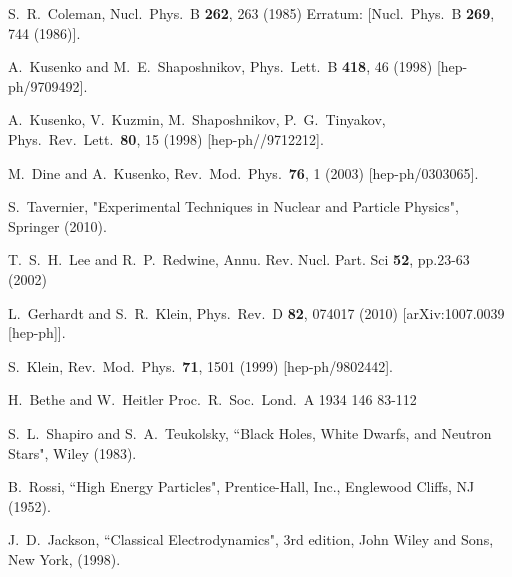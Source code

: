   S.~R.~Coleman,
  Nucl.\ Phys.\ B {\bf 262}, 263 (1985)
  Erratum: [Nucl.\ Phys.\ B {\bf 269}, 744 (1986)].


  A.~Kusenko and M.~E.~Shaposhnikov,
  Phys.\ Lett.\ B {\bf 418}, 46 (1998)
  [hep-ph/9709492].


  A.~Kusenko, V.~Kuzmin, M.~Shaposhnikov, P.~G.~Tinyakov,
  Phys.\ Rev.\ Lett.\ {\bf 80}, 15 (1998)
  [hep-ph//9712212].

  M.~Dine and A.~Kusenko,
  Rev.\ Mod.\ Phys.\  {\bf 76}, 1 (2003)
  [hep-ph/0303065].


S.~Tavernier, "Experimental Techniques in Nuclear and Particle Physics", Springer (2010).

T.~S.~H.~Lee and R.~P.~Redwine,
 Annu. Rev. Nucl. Part. Sci {\bf 52}, pp.23-63 (2002)

  L.~Gerhardt and S.~R.~Klein,
  Phys.\ Rev.\ D {\bf 82}, 074017 (2010)
  [arXiv:1007.0039 [hep-ph]].


  S.~Klein,
  Rev.\ Mod.\ Phys.\  {\bf 71}, 1501 (1999)
  [hep-ph/9802442].


  H.~Bethe and W.~Heitler
  Proc.\ R.\ Soc.\ Lond.\ A 1934 146 83-112

S.~L.~Shapiro and S.~A.~Teukolsky, ``Black Holes, White Dwarfs, and Neutron Stars", Wiley (1983).

B.~Rossi, ``High Energy Particles", Prentice-Hall, Inc., Englewood Cliffs, NJ (1952).

J.~D.~Jackson, ``Classical Electrodynamics", 3rd edition, John Wiley and Sons, New
York, (1998).
